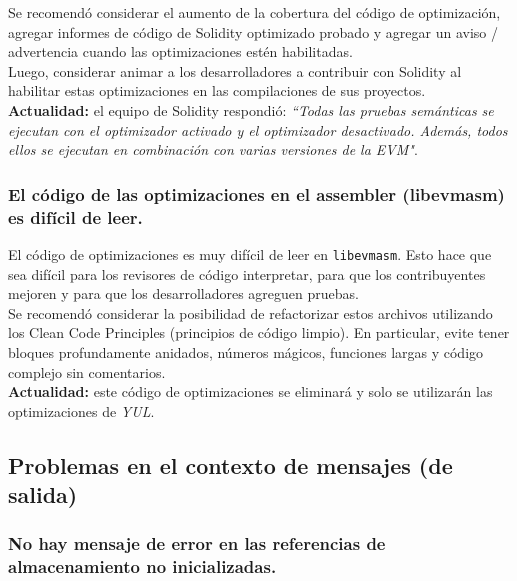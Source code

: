 Se recomendó considerar el aumento de la cobertura del código de optimización, agregar informes de código de Solidity optimizado probado y agregar un aviso / advertencia cuando las optimizaciones estén habilitadas.\\

Luego, considerar animar a los desarrolladores a contribuir con Solidity al habilitar estas optimizaciones en las compilaciones de sus proyectos.\\

\textbf{Actualidad:} el equipo de Solidity respondió: \textit{``Todas las pruebas semánticas se ejecutan con el optimizador activado y el optimizador desactivado. Además, todos ellos se ejecutan en combinación con varias versiones de la EVM"}.\\

\subsubsection{El código de las optimizaciones en el assembler (libevmasm) es difícil de leer.}

El código de optimizaciones\cite{GHlibevmasmCSE} es muy difícil de leer en \texttt{libevmasm}. Esto hace que sea difícil para los revisores de código interpretar, para que los contribuyentes mejoren y para que los desarrolladores agreguen pruebas.\\

Se recomendó considerar la posibilidad de refactorizar estos archivos utilizando los Clean Code Principles\cite{MediumMindorksCleanCode} (principios de código limpio). En particular, evite tener bloques profundamente anidados, números mágicos, funciones largas y código complejo sin comentarios.\\

\textbf{Actualidad:} este código de optimizaciones se eliminará y solo se utilizarán las optimizaciones de \textit{YUL}.\\

\subsection{Problemas en el contexto de mensajes (de salida)}

\subsubsection{No hay mensaje de error en las referencias de almacenamiento no inicializadas.}

